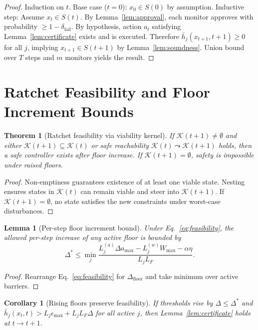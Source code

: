 \documentclass[11pt,a4paper]{article}
\newtheorem{theorem}{Theorem}
\newtheorem{lemma}{Lemma}
\newtheorem{corollary}{Corollary}
\begin{document}
\begin{proof}
Induction on $t$. Base case ($t=0$): $x_0 \in S(0)$ by assumption. Inductive step: Assume $x_t \in S(t)$. By Lemma~\ref{lem:approval}, each monitor approves with probability $\geq 1 - \delta_{\text{fail}}$. By hypothesis, action $a_t$ satisfying Lemma~\ref{lem:certificate} exists and is executed. Therefore $\bar{h}_j(x_{t+1}, t+1) \geq 0$ for all $j$, implying $x_{t+1} \in S(t+1)$ by Lemma~\ref{lem:soundness}. Union bound over $T$ steps and $m$ monitors yields the result.
\end{proof}

\section{Ratchet Feasibility and Floor Increment Bounds}

\begin{theorem}[Ratchet feasibility via viability kernel]
\label{thm:ratchet}
If $\mathcal{K}(t+1) \neq \emptyset$ and either $\mathcal{K}(t+1) \subseteq \mathcal{K}(t)$ or safe reachability $\mathcal{K}(t) \leadsto \mathcal{K}(t+1)$ holds, then a safe controller exists after floor increase. If $\mathcal{K}(t+1) = \emptyset$, safety is impossible under raised floors.
\end{theorem}

\begin{proof}
Non-emptiness guarantees existence of at least one viable state. Nesting ensures states in $\mathcal{K}(t)$ can remain viable and steer into $\mathcal{K}(t+1)$. If $\mathcal{K}(t+1) = \emptyset$, no state satisfies the new constraints under worst-case disturbances.
\end{proof}

\begin{lemma}[Per-step floor increment bound]
\label{lem:delta}
Under Eq.~\eqref{eq:feasibility}, the allowed per-step increase of any active floor is bounded by
$$\Delta^* \leq \min_j \frac{L_j^{(a)} \Delta a_{\max} - L_j^{(w)} W_{\max} - \alpha \eta}{L_j L_F}.$$
\end{lemma}

\begin{proof}
Rearrange Eq.~\eqref{eq:feasibility} for $\Delta_{\text{floor}}$ and take minimum over active barriers.
\end{proof}

\begin{corollary}[Rising floors preserve feasibility]
If thresholds rise by $\Delta \leq \Delta^*$ and $\bar{h}_j(x_t,t) > L_j \epsilon_{\max} + L_j L_F \Delta$ for all active $j$, then Lemma~\ref{lem:certificate} holds at $t \to t+1$.
\end{corollary}
\end{document}
